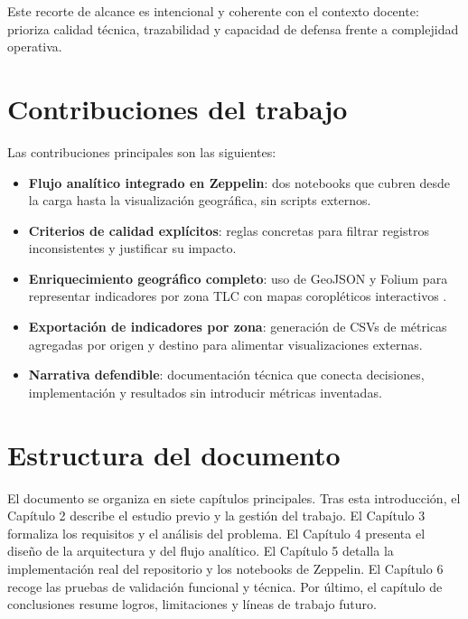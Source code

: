 Este recorte de alcance es intencional y coherente con el contexto docente: prioriza
calidad técnica, trazabilidad y capacidad de defensa frente a complejidad operativa.

\section{Contribuciones del trabajo}
Las contribuciones principales son las siguientes:
\begin{itemize}
	\item \textbf{Flujo analítico integrado en Zeppelin}: dos notebooks que cubren
	desde la carga hasta la visualización geográfica, sin scripts externos.
	\item \textbf{Criterios de calidad explícitos}: reglas concretas para filtrar registros
	inconsistentes y justificar su impacto.
	\item \textbf{Enriquecimiento geográfico completo}: uso de GeoJSON y Folium para
	representar indicadores por zona TLC con mapas coropléticos interactivos
	\cite{foliumdocs,geojsonspec}.
	\item \textbf{Exportación de indicadores por zona}: generación de CSVs de métricas
	agregadas por origen y destino para alimentar visualizaciones externas.
	\item \textbf{Narrativa defendible}: documentación técnica que conecta decisiones,
	implementación y resultados sin introducir métricas inventadas.
\end{itemize}

\section{Estructura del documento}
El documento se organiza en siete capítulos principales. Tras esta introducción,
el Capítulo 2 describe el estudio previo y la gestión del trabajo. El Capítulo 3
formaliza los requisitos y el análisis del problema. El Capítulo 4 presenta el
diseño de la arquitectura y del flujo analítico. El Capítulo 5 detalla la implementación
real del repositorio y los notebooks de Zeppelin. El Capítulo 6 recoge
las pruebas de validación funcional y técnica. Por último, el capítulo de
conclusiones resume logros, limitaciones y líneas de trabajo futuro.

